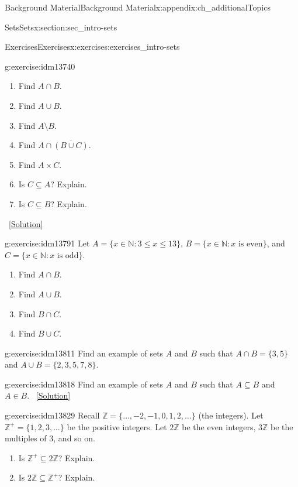 \documentclass[oneside,10pt,]{book}
\numberwithin{equation}{chapter}
\def\N{\mathbb N}
\def\Z{\mathbb Z}
\def\st{:}
\begin{document}
\begin{appendixptx}{Background Material}{}{Background Material}{}{}{x:appendix:ch_additionalTopics}
\begin{sectionptx}{Sets}{}{Sets}{}{}{x:section:sec_intro-sets}
\begin{exercises-subsection}{Exercises}{}{Exercises}{}{}{x:exercises:exercises_intro-sets}
\begin{divisionexercise}{1}{}{}{g:exercise:idm13740}
\begin{enumerate}[label=(\alph*)]
\item{}Find \(A \cap B\).%
\item{}Find \(A \cup B\).%
\item{}Find \(A \setminus B\).%
\item{}Find \(A \cap \overline{(B \cup C)}\).%
\item{}Find \(A \times C\).%
\item{}Is \(C \subseteq A\)? Explain.%
\item{}Is \(C \subseteq B\)? Explain.%
\end{enumerate}
%
\qquad~\hfill{\tiny\hyperlink{g:solution:idm13769-main}{[Solution]}}\end{divisionexercise}%
\begin{divisionexercise}{2}{}{}{g:exercise:idm13791}%
Let \(A = \{x \in \N \st 3 \le x \le 13\}\), \(B = \{x \in \N \st x \mbox{ is even} \}\), and \(C = \{x \in \N \st x \mbox{ is odd} \}\).%
\par
%
\begin{enumerate}[label=(\alph*)]
\item{}Find \(A \cap B\).%
\item{}Find \(A \cup B\).%
\item{}Find \(B \cap C\).%
\item{}Find \(B \cup C\).%
\end{enumerate}
%
\end{divisionexercise}%
\begin{divisionexercise}{3}{}{}{g:exercise:idm13811}%
Find an example of sets \(A\) and \(B\) such that \(A\cap B = \{3, 5\}\) and \(A \cup B = \{2, 3, 5, 7, 8\}\).%
\end{divisionexercise}%
\begin{divisionexercise}{4}{}{}{g:exercise:idm13818}%
Find an example of sets \(A\) and \(B\) such that \(A \subseteq B\) and \(A \in B\).%
\qquad~\hfill{\tiny\hyperlink{g:solution:idm13825-main}{[Solution]}}\end{divisionexercise}%
\begin{divisionexercise}{5}{}{}{g:exercise:idm13829}%
Recall \(\Z = \{\ldots,-2,-1,0, 1,2,\ldots\}\) (the integers). Let \(\Z^+ = \{1, 2, 3, \ldots\}\) be the positive integers. Let \(2\Z\) be the even integers, \(3\Z\) be the multiples of 3, and so on.%
\par
%
\begin{enumerate}[label=(\alph*)]
\item{}Is \(\Z^+ \subseteq 2\Z\)? Explain.%
\item{}Is \(2\Z \subseteq \Z^+\)? Explain.%

\end{enumerate}
\end{divisionexercise}
\end{exercises-subsection}
\end{sectionptx}
\end{appendixptx}
\end{document}
